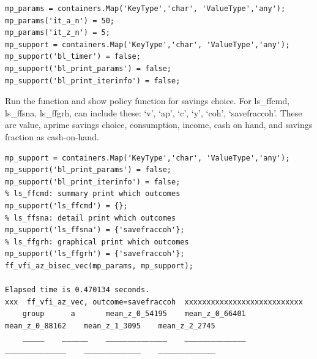 \documentclass[
]{book}
\begin{document}
\begin{verbatim}
mp_params = containers.Map('KeyType','char', 'ValueType','any');
mp_params('it_a_n') = 50;
mp_params('it_z_n') = 5;
mp_support = containers.Map('KeyType','char', 'ValueType','any');
mp_support('bl_timer') = false;
mp_support('bl_print_params') = false;
mp_support('bl_print_iterinfo') = false;
\end{verbatim}

Run the function and show policy function for savings choice. For
ls\_ffcmd, ls\_ffsna, ls\_ffgrh, can include these: `v', `ap', `c', `y',
`coh', `savefraccoh'. These are value, aprime savings choice,
consumption, income, cash on hand, and savings fraction as cash-on-hand.

\begin{verbatim}
mp_support = containers.Map('KeyType','char', 'ValueType','any');
mp_support('bl_print_params') = false;
mp_support('bl_print_iterinfo') = false;
% ls_ffcmd: summary print which outcomes
mp_support('ls_ffcmd') = {};
% ls_ffsna: detail print which outcomes
mp_support('ls_ffsna') = {'savefraccoh'};
% ls_ffgrh: graphical print which outcomes
mp_support('ls_ffgrh') = {'savefraccoh'};
ff_vfi_az_bisec_vec(mp_params, mp_support);

Elapsed time is 0.470134 seconds.
xxx  ff_vfi_az_vec, outcome=savefraccoh  xxxxxxxxxxxxxxxxxxxxxxxxxxx
    group      a       mean_z_0_54195    mean_z_0_66401    mean_z_0_88162    mean_z_1_3095    mean_z_2_2745
    _____    ______    ______________    ______________    ______________    _____________    _____________


\end{verbatim}
\end{document}
